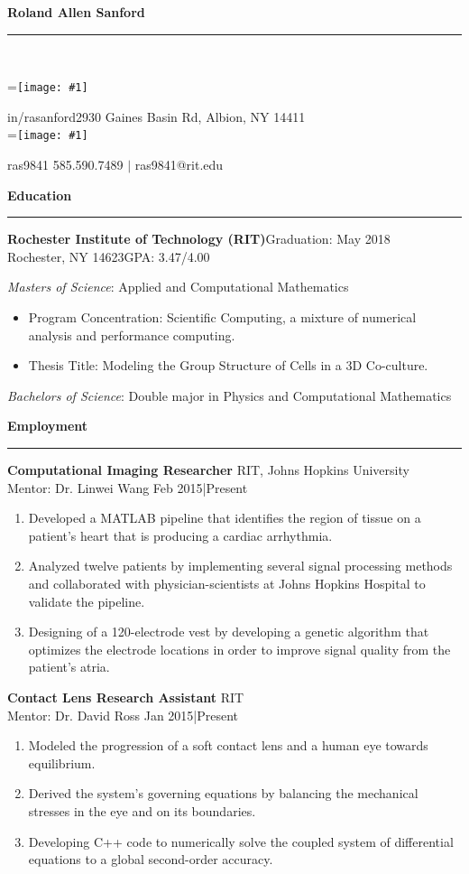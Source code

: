 \documentclass{article}
\newcommand{\fullbar}{\rule{\textwidth}{0.4pt}} %
\newcommand{\heading}[1]{{\Large\textbf{#1}\vspace{-.2cm}\newline\fullbar}} %
\newcommand{\job}[5]{
	\textbf{#1} \hfill #2\\
	Mentor: #3 \hfill #4|#5
	}
\newcommand{\secspace}{.1cm}
\newcommand{\dash}{\item[-]\vspace{-.05cm}}
\newcommand{\vcenteredinclude}[1]{\begingroup
	\setbox0=\hbox{\texttt{[image: \#1]}}%
	\parbox{\wd0}{\box0}\endgroup}
\begin{document}
\heading{Roland Allen Sanford}\\
\begin{minipage}{\textwidth}
	\vspace{.3cm}
\vcenteredinclude{linked_in.png} \quad in/rasanford\hfill	2930 Gaines Basin Rd, Albion, NY 14411 	\vspace{.05cm}\\
\vcenteredinclude{github.png}
\quad ras9841 \hfill 585.590.7489 $|$ ras9841@rit.edu
\vspace{.4cm}
\end{minipage}

\vspace{\secspace}
\heading{Education}
\vspace{-.7cm}
\begin{flushleft}
	\textbf{Rochester Institute of Technology (RIT)}\hfill Graduation: May 2018 \\Rochester, NY 14623\hfill GPA: 3.47/4.00
\end{flushleft}

\textit{Masters of Science}: Applied and  Computational Mathematics
\begin{itemize}
	\vspace{-.2cm}
	\dash Program Concentration: Scientific Computing, a mixture of numerical analysis and performance computing. 
	\vspace{-.2cm}
	\dash Thesis Title: Modeling the Group Structure of Cells in a 3D Co-culture.
\end{itemize}
\textit{Bachelors of Science}: Double major in Physics and Computational Mathematics \\

\vspace{\secspace}
\heading{Employment}
\job{Computational Imaging Researcher}{RIT, Johns Hopkins University}
{Dr. Linwei Wang}{Feb 2015}{Present}
\begin{enumerate}
	\dash Developed a MATLAB pipeline that identifies the region of tissue on a patient's heart that is producing a cardiac arrhythmia. 
	\dash Analyzed twelve patients by implementing several signal processing methods and collaborated with physician-scientists at Johns Hopkins Hospital to validate the pipeline.
	\dash Designing of a 120-electrode vest by developing a genetic algorithm that optimizes the electrode locations in order to improve signal quality from the patient's atria.  
\end{enumerate}

\job{Contact Lens Research Assistant}{RIT}{Dr. David Ross}{Jan 2015}{Present}
\begin{enumerate}
	\dash Modeled the progression of a soft contact lens and a human eye towards equilibrium.
	\dash Derived the system's governing equations by balancing the mechanical stresses in the eye and on its boundaries.
	\dash Developing C++ code to numerically solve the coupled system of differential equations to a global second-order accuracy.
\end{enumerate}
\end{document}
